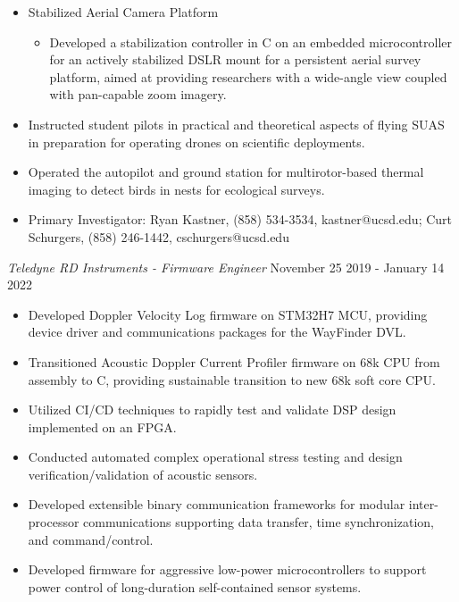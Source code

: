 \documentclass[line,margin]{res}
\begin{document}
\begin{resume}
\begin{itemize}
\begin{itemize}
			\item Explored technology to dynamically generate and optimize drone flight paths for aerial survey using real-time feedback from cameras and other drone sensors, including terrain following/mapping and source seeking techniques.
		\end{itemize}
		\item Stabilized Aerial Camera Platform
		\begin{itemize}
			\item Developed a stabilization controller in C on an embedded microcontroller for an actively stabilized DSLR mount for a persistent aerial survey platform, aimed at providing researchers with a wide-angle view coupled with pan-capable zoom imagery.
		\end{itemize}
		\item Instructed student pilots in practical and theoretical aspects of flying SUAS in preparation for operating drones on scientific deployments.
		\item Operated the autopilot and ground station for multirotor-based thermal imaging to detect birds in nests for ecological surveys.
		\item Primary Investigator: Ryan Kastner, (858) 534-3534, kastner@ucsd.edu; Curt Schurgers, (858) 246-1442, cschurgers@ucsd.edu
	\end{itemize}

	{\sl Teledyne RD Instruments - Firmware Engineer} \hfill November 25 2019 - January 14 2022
	\begin{itemize}
		\item Developed Doppler Velocity Log firmware on STM32H7 MCU, providing device driver and communications packages for the WayFinder DVL.
		\item Transitioned Acoustic Doppler Current Profiler firmware on 68k CPU from assembly to C, providing sustainable transition to new 68k soft core CPU.
		\item Utilized CI/CD techniques to rapidly test and validate DSP design implemented on an FPGA.
		\item Conducted automated complex operational stress testing and design verification/validation of acoustic sensors.
		\item Developed extensible binary communication frameworks for modular inter-processor communications supporting data transfer, time synchronization, and command/control.
		\item Developed firmware for aggressive low-power microcontrollers to support power control of long-duration self-contained sensor systems.
	\end{itemize}


\end{resume}
\end{document}
